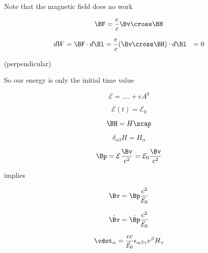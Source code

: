 Note that the magnetic field does no work

\begin{equation}\label{eqn:relativisticElectrodynamicsT3:n}
\BF = \frac{e}{c} \Bv \cross \BH
\end{equation}

\begin{align*}
dW = 
\BF \cdot d\Bl
&=
\frac{e}{c} (\Bv \cross \BH) \cdot d\Bl
&= 0
\end{align*}

(perpendicular)

So our energy is only the initial time value

\begin{equation}\label{eqn:relativisticElectrodynamicsT3:n}
\mathcal{E} = .... + e A^0
\end{equation}

\begin{equation}\label{eqn:relativisticElectrodynamicsT3:n}
\mathcal{E}(t) = \mathcal{E}_0
\end{equation}

\begin{equation}\label{eqn:relativisticElectrodynamicsT3:n}
\BH = H \zcap
\end{equation}

\begin{equation}\label{eqn:relativisticElectrodynamicsT3:n}
\delta_{\alpha 3} H = H_\alpha
\end{equation}

\begin{equation}\label{eqn:relativisticElectrodynamicsT3:n}
\Bp = \mathcal{E} \frac{\Bv}{c^2} = \mathcal{E}_0 \frac{\Bv}{c^2}
\end{equation}

implies

\begin{equation}\label{eqn:relativisticElectrodynamicsT3:n}
\Bv = \Bp \frac{c^2}{\mathcal{E}_0}
\end{equation}

\begin{equation}\label{eqn:relativisticElectrodynamicsT3:n}
\dot{\Bv} = \dot{\Bp} \frac{c^2}{\mathcal{E}_0}
\end{equation}

\begin{equation}\label{eqn:relativisticElectrodynamicsT3:n}
\vdot_\alpha = \frac{e c}{\mathcal{E}_0} \epsilon_{\alpha \beta \gamma} v^\beta H_\gamma
\end{equation}

